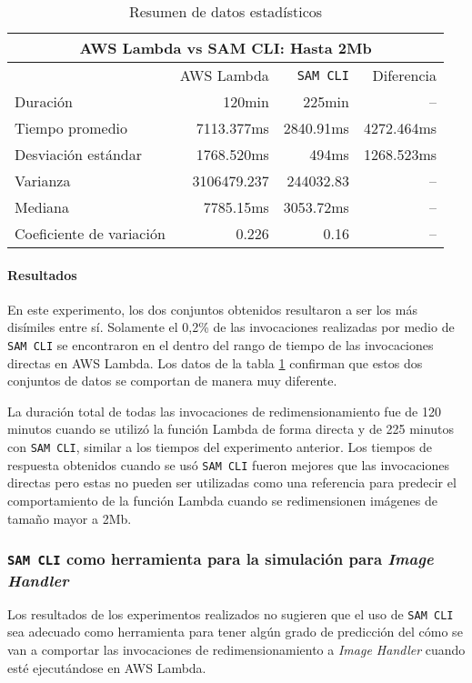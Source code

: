 \begin{table}
    \centering
    \begin{tabular}{l|r|r|r}
        \toprule[1.5pt]
         \multicolumn{4}{c}{\textbf{AWS Lambda vs SAM CLI: Hasta 2Mb}} \\
         \midrule
         & AWS Lambda & \texttt{SAM CLI} & Diferencia \\ 
         \midrule
        Duración & 120min & 225min & -- \\
        Tiempo promedio  & 7113.377ms & 2840.91ms & 4272.464ms\\
        Desviación estándar & 1768.520ms & 494ms & 1268.523ms \\
        Varianza & 3106479.237 & 244032.83 & -- \\
        Mediana & 7785.15ms & 3053.72ms & -- \\
        Coeficiente de variación & 0.226 & 0.16 & -- \\                        
        \bottomrule[1.5pt]
    \end{tabular}
    \caption{Resumen de datos estadísticos}
    \label{table:sam-datos-estadisticos-hasta-2mb}
\end{table}

\paragraph{Resultados} En este experimento, los dos conjuntos obtenidos resultaron a ser los más disímiles entre sí. Solamente el 0,2\% de las invocaciones realizadas por medio de \texttt{SAM CLI} se encontraron en el dentro del rango de tiempo de las invocaciones directas en AWS Lambda. Los datos de la tabla \ref{table:sam-datos-estadisticos-hasta-2mb} confirman que estos dos conjuntos de datos se comportan de manera muy diferente. 

La duración total de todas las invocaciones de redimensionamiento fue de 120 minutos cuando se utilizó la función Lambda de forma directa y de 225 minutos con \texttt{SAM CLI}, similar a los tiempos del experimento anterior. Los tiempos de respuesta obtenidos cuando se usó \texttt{SAM CLI} fueron mejores que las invocaciones directas pero estas no pueden ser utilizadas como una referencia para predecir el comportamiento de la función Lambda cuando se redimensionen imágenes de tamaño mayor a 2Mb.

\subsubsection{\texttt{SAM CLI} como herramienta para la simulación para \emph{Image Handler}}
Los resultados de los experimentos realizados no sugieren que el uso de \texttt{SAM CLI} sea adecuado como herramienta para tener algún grado de predicción del cómo se van a comportar las invocaciones de redimensionamiento a \emph{Image Handler} cuando esté ejecutándose en AWS Lambda.

